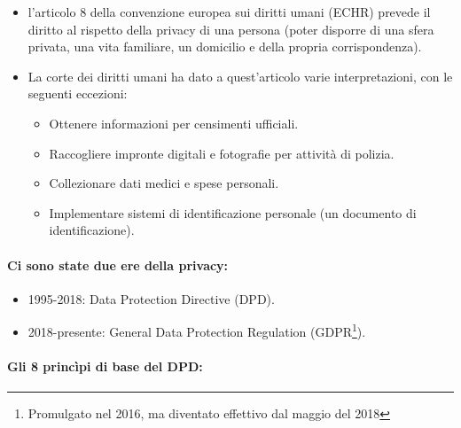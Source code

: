 \begin{itemize}
  \item l'articolo 8 della convenzione europea sui diritti umani (ECHR) prevede il diritto al rispetto della privacy di una persona (poter disporre di una sfera privata, una vita familiare, un domicilio e della propria corrispondenza). 
  \item La corte dei diritti umani ha dato a quest'articolo varie interpretazioni, con le seguenti eccezioni: 
    \begin{itemize}
      \item Ottenere informazioni per censimenti ufficiali. 
      \item Raccogliere impronte digitali e fotografie per attività di polizia. 
      \item Collezionare dati medici e spese personali. 
      \item Implementare sistemi di identificazione personale (un documento di identificazione).
    \end{itemize}
\end{itemize}


\paragraph{Ci sono state due ere della privacy:}

\begin{itemize}
  \item 1995-2018: Data Protection Directive (DPD). 
  \item 2018-presente: General Data Protection Regulation (GDPR\footnote{Promulgato nel 2016, ma diventato effettivo dal maggio del 2018}).
\end{itemize}


\paragraph{Gli 8 princìpi di base del DPD:}

